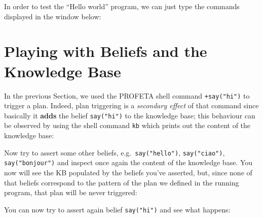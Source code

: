 In order to test the ``Hello world'' program, we can just type the commands
displayed in the window below:


\section{Playing with Beliefs and the Knowledge Base}
In the previous Section, we used the PROFETA shell command
\texttt{+say("hi")} to
trigger a plan.
Indeed, plan triggering is a \emph{secondary effect} of that command since
basically it \textbf{adds} the belief \texttt{say("hi")} to the knowledge base;
this behaviour can be observed by using the shell command \texttt{kb} which
prints out the content of the knowledge base:

Now try to assert some other beliefs, e.g.~\texttt{say("hello")},
\texttt{say("ciao")}, \texttt{say("bonjour")} and inspect once again the
content of the knowledge base. You now will see the KB populated by the
beliefs you've asserted, but, since none of that beliefs correspond to the
pattern of the plan we defined in the running program, that plan will be
never triggered:

You can now try to assert again belief \texttt{say("hi")} and see what
happens:

